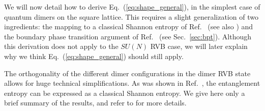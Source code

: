 \documentclass[11pt]{iopart}
\begin{document}
We will now detail how to derive Eq.~(\ref{eq:shape_general}), in the simplest case of quantum dimers on the square lattice. This requires a slight generalization of two ingredients: the mapping to a classical Shannon entropy of Ref.~\cite{Shannonee} (see also \cite{FurukawaMisguich}) and the boundary phase transition argument of Ref.~\cite{Stephan2011} (see Sec.~\ref{sec:bpt}). Although this derivation does not apply to the $SU(N)$ RVB case, we will later explain why we think Eq.~(\ref{eq:shape_general}) should still apply.

The orthogonality of the different dimer configurations in the dimer RVB state allows for huge technical simplifications. As was shown in Ref.~\cite{Shannonee}, the entanglement entropy can be expressed as a classical Shannon entropy. We give here only a brief summary of the results, and refer to \cite{Shannonee} for more details.
\end{document}
